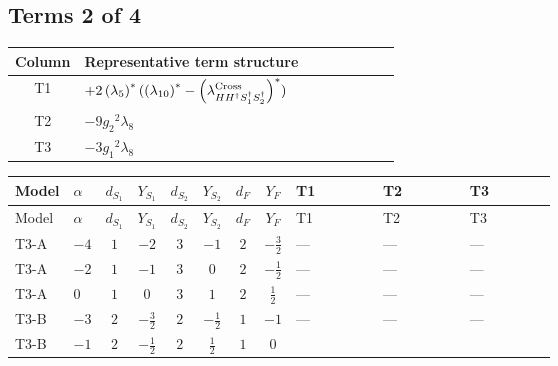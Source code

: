 \documentclass[8pt]{article}
\begin{document}
\begin{landscape}
\subsection*{Terms 2 of 4}
\begin{center}
\begin{tabular}{@{}c >{\raggedright\arraybackslash}p{0.82\linewidth}@{}}
\toprule
Column & Representative term structure \\
\midrule
T1 & \(\displaystyle +2 \left({\lambda_5}\right)^{*} (\left({\lambda_{10}}\right)^{*}-\left({\lambda_{H H^\dagger S_1^\dagger S_2^\dagger}^{\rm Cross}}\right)^{*})\) \\
\midrule
T2 & \(\displaystyle -9 {g_2}^2 {\lambda_{8}}\) \\
\midrule
T3 & \(\displaystyle -3 {g_1}^2 {\lambda_{8}}\) \\
\midrule
\bottomrule
\end{tabular}
\end{center}
\smallskip
\tiny
\begin{longtable}{@{}llcccccc >{\raggedright\arraybackslash}p{0.21\linewidth} >{\raggedright\arraybackslash}p{0.21\linewidth} >{\raggedright\arraybackslash}p{0.21\linewidth}@{}}
\toprule
Model & $\alpha$ & $d_{S_1}$ & $Y_{S_1}$ & $d_{S_2}$ & $Y_{S_2}$ & $d_F$ & $Y_F$ & T1 & T2 & T3 \\
\midrule
\endfirsthead
\toprule
Model & $\alpha$ & $d_{S_1}$ & $Y_{S_1}$ & $d_{S_2}$ & $Y_{S_2}$ & $d_F$ & $Y_F$ & T1 & T2 & T3 \\
\midrule
\endhead
T3-A & $-4$ & $1$ & $-2$ & $3$ & $-1$ & $2$ & $-\frac{3}{2}$ & --- & --- & --- \\
\midrule
T3-A & $-2$ & $1$ & $-1$ & $3$ & $0$ & $2$ & $-\frac{1}{2}$ & --- & --- & --- \\
\midrule
T3-A & $0$ & $1$ & $0$ & $3$ & $1$ & $2$ & $\frac{1}{2}$ & --- & --- & --- \\
\midrule
T3-B & $-3$ & $2$ & $-\frac{3}{2}$ & $2$ & $-\frac{1}{2}$ & $1$ & $-1$ & --- & --- & --- \\
\midrule
T3-B & $-1$ & $2$ & $-\frac{1}{2}$ & $2$ & $\frac{1}{2}$ & $1$ & $0$ & \scriptsize\adjustbox{max width=\linewidth}{$\begin{gathered} +2 \left({\lambda_5}\right)^{*} (\left({\lambda_{10}}\right)^{*}-\left({\lambda_{H H^\dagger S_1^\dagger S_2^\dagger}^{\rm Cross}}\right)^{*})\end{gathered}$} & \scriptsize\adjustbox{max width=\linewidth}{$\begin{gathered} -9 {g_2}^2 {\lambda_{8}}\end{gathered}$} & \scriptsize\adjustbox{max width=\linewidth}{$\begin{gathered} -3 {g_1}^2 {\lambda_{8}}\end{gathered}$} \\

\end{longtable}
\end{landscape}
\end{document}

